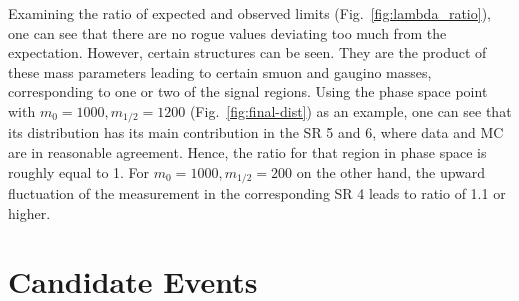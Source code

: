 Examining the ratio of expected and observed limits (Fig.~\ref{fig:lambda_ratio}), one can see that there are no rogue values deviating too much from the expectation. However, certain structures can be seen. They are the product of these mass parameters leading to certain smuon and gaugino masses, corresponding to one or two of the signal regions. Using the phase space point with $m_0 = 1000, m_{1/2} = 1200$ (Fig.~\ref{fig:final-dist}) as an example, one can see that its distribution has its main contribution in the SR 5 and 6, where data and MC are in reasonable agreement. Hence, the ratio for that region in phase space is roughly equal to 1. For $m_0 = 1000, m_{1/2} = 200$ on the other hand, the upward fluctuation of the measurement in the corresponding SR 4 leads to ratio of 1.1 or higher.


\section{Candidate Events}
\label{sec:candidate-events}


